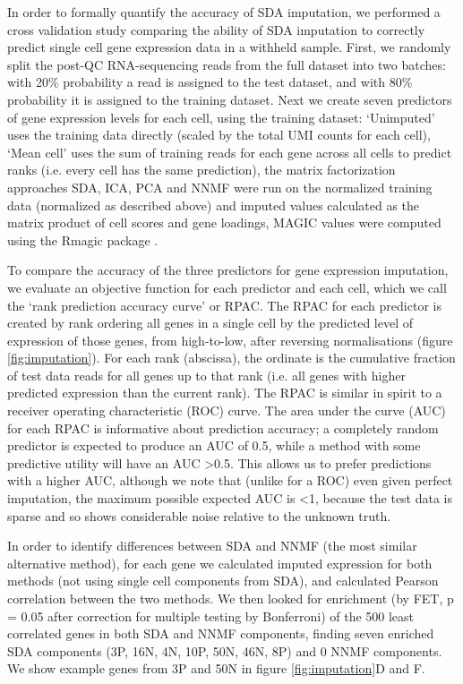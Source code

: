 In order to formally quantify the accuracy of SDA imputation, we performed a cross validation study comparing the ability of SDA imputation to correctly predict single cell gene expression data in a withheld sample. First, we randomly split the post-QC RNA-sequencing reads from the full dataset into two batches: with 20\% probability a read is assigned to the test dataset, and with 80\% probability it is assigned to the training dataset. Next we create seven predictors of gene expression levels for each cell, using the training dataset: ‘Unimputed’ uses the training data directly (scaled by the total UMI counts for each cell), ‘Mean cell’ uses the sum of training reads for each gene across all cells to predict ranks (i.e. every cell has the same prediction), the matrix factorization approaches SDA, ICA, PCA and NNMF were run on the normalized training data (normalized as described above) and imputed values calculated as the matrix product of cell scores and gene loadings, MAGIC values were computed using the Rmagic package \parencite{vanDijk2018Recovering}.

To compare the accuracy of the three predictors for gene expression imputation, we evaluate an objective function for each predictor and each cell, which we call the ‘rank prediction accuracy curve’ or RPAC. The RPAC for each predictor is created by rank ordering all genes in a single cell by the predicted level of expression of those genes, from high-to-low, after reversing normalisations (figure \ref{fig:imputation}). For each rank (abscissa), the ordinate is the cumulative fraction of test data reads for all genes up to that rank (i.e. all genes with higher predicted expression than the current rank). The RPAC is similar in spirit to a receiver operating characteristic (ROC) curve. The area under the curve (AUC) for each RPAC is informative about prediction accuracy; a completely random predictor is expected to produce an AUC of 0.5, while a method with some predictive utility will have an AUC >0.5. This allows us to prefer predictions with a higher AUC, although we note that (unlike for a ROC) even given perfect imputation, the maximum possible expected AUC is <1, because the test data is sparse and so shows considerable noise relative to the unknown truth.

In order to identify differences between SDA and NNMF (the most similar alternative method), for each gene we calculated imputed expression for both methods (not using single cell components from SDA), and calculated Pearson correlation between the two methods. We then looked for enrichment (by FET, p = 0.05 after correction for multiple testing by Bonferroni) of the 500 least correlated genes in both SDA and NNMF components, finding seven enriched SDA components (3P, 16N, 4N, 10P, 50N, 46N, 8P) and 0 NNMF components. We show example genes from 3P and 50N in figure \ref{fig:imputation}D and F.

